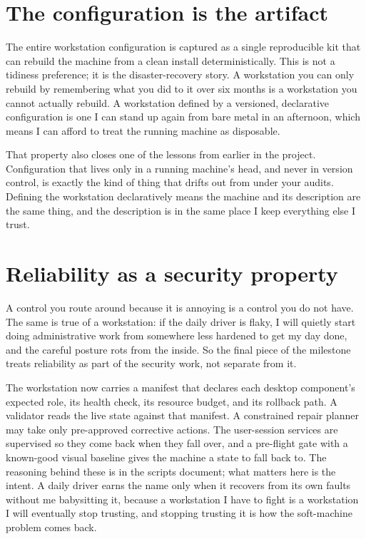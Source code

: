 \documentclass[12pt]{article}
\begin{document}
\section{The configuration is the artifact}

The entire workstation configuration is captured as a single reproducible kit that can rebuild the machine from a clean install deterministically. This is not a tidiness preference; it is the disaster-recovery story. A workstation you can only rebuild by remembering what you did to it over six months is a workstation you cannot actually rebuild. A workstation defined by a versioned, declarative configuration is one I can stand up again from bare metal in an afternoon, which means I can afford to treat the running machine as disposable.

That property also closes one of the lessons from earlier in the project. Configuration that lives only in a running machine's head, and never in version control, is exactly the kind of thing that drifts out from under your audits. Defining the workstation declaratively means the machine and its description are the same thing, and the description is in the same place I keep everything else I trust.

\section{Reliability as a security property}

A control you route around because it is annoying is a control you do not have. The same is true of a workstation: if the daily driver is flaky, I will quietly start doing administrative work from somewhere less hardened to get my day done, and the careful posture rots from the inside. So the final piece of the milestone treats reliability as part of the security work, not separate from it.

The workstation now carries a manifest that declares each desktop component's expected role, its health check, its resource budget, and its rollback path. A validator reads the live state against that manifest. A constrained repair planner may take only pre-approved corrective actions. The user-session services are supervised so they come back when they fall over, and a pre-flight gate with a known-good visual baseline gives the machine a state to fall back to. The reasoning behind these is in the scripts document; what matters here is the intent. A daily driver earns the name only when it recovers from its own faults without me babysitting it, because a workstation I have to fight is a workstation I will eventually stop trusting, and stopping trusting it is how the soft-machine problem comes back.
\end{document}
